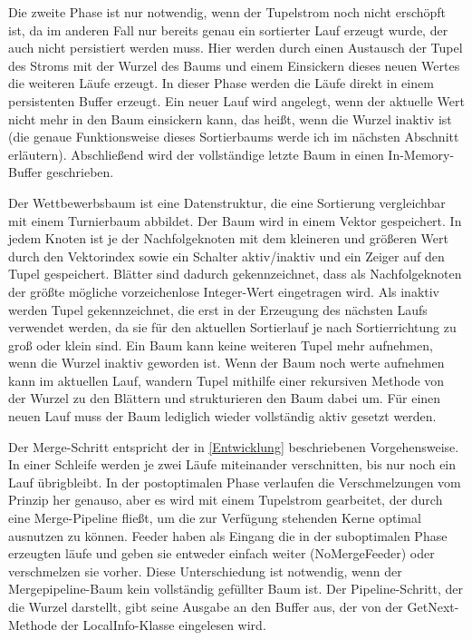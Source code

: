 \documentclass[a4paper,12pt,twoside]{article}
\begin{document}
Die zweite Phase ist nur notwendig, wenn der Tupelstrom noch nicht erschöpft ist, da im anderen Fall nur bereits genau ein sortierter Lauf erzeugt wurde, der auch nicht persistiert werden muss. Hier werden durch einen Austausch der Tupel des Stroms mit der Wurzel des Baums und einem Einsickern dieses neuen Wertes die weiteren Läufe erzeugt. In dieser Phase werden die Läufe direkt in einem persistenten Buffer erzeugt. Ein neuer Lauf wird angelegt, wenn der aktuelle Wert nicht mehr in den Baum einsickern kann, das heißt, wenn die Wurzel inaktiv ist (die genaue Funktionsweise dieses Sortierbaums werde ich im nächsten Abschnitt erläutern). Abschließend wird der vollständige letzte Baum in einen In-Memory-Buffer geschrieben.

Der Wettbewerbsbaum ist eine Datenstruktur, die eine Sortierung vergleichbar mit einem Turnierbaum abbildet. Der Baum wird in einem Vektor gespeichert. In jedem Knoten ist je der Nachfolgeknoten mit dem kleineren und größeren Wert durch den Vektorindex sowie ein Schalter aktiv/inaktiv und ein Zeiger auf den Tupel gespeichert. Blätter sind dadurch gekennzeichnet, dass als Nachfolgeknoten der größte mögliche vorzeichenlose Integer-Wert eingetragen wird. Als inaktiv werden Tupel gekennzeichnet, die erst in der Erzeugung des nächsten Laufs verwendet werden, da sie für den aktuellen Sortierlauf je nach Sortierrichtung zu groß oder klein sind. Ein Baum kann keine weiteren Tupel mehr aufnehmen, wenn die Wurzel inaktiv geworden ist. Wenn der Baum noch werte aufnehmen kann im aktuellen Lauf, wandern Tupel mithilfe einer rekursiven Methode von der Wurzel zu den Blättern und strukturieren den Baum dabei um. Für einen neuen Lauf muss der Baum lediglich wieder vollständig aktiv gesetzt werden. 

Der Merge-Schritt entspricht der in \autoref{Entwicklung} beschriebenen Vorgehensweise. In einer Schleife werden je zwei Läufe miteinander verschnitten, bis nur noch ein Lauf übrigbleibt. In der postoptimalen Phase verlaufen die Verschmelzungen vom Prinzip her genauso, aber es wird mit einem Tupelstrom gearbeitet, der durch eine Merge-Pipeline fließt, um die zur Verfügung stehenden Kerne optimal ausnutzen zu können. Feeder haben als Eingang die in der suboptimalen Phase erzeugten läufe und geben sie entweder einfach weiter (NoMergeFeeder) oder verschmelzen sie vorher. Diese Unterschiedung ist notwendig, wenn der Mergepipeline-Baum kein vollständig gefüllter Baum ist. Der Pipeline-Schritt, der die Wurzel darstellt, gibt seine Ausgabe an den Buffer aus, der von der GetNext-Methode der LocalInfo-Klasse eingelesen wird. 
\end{document}
